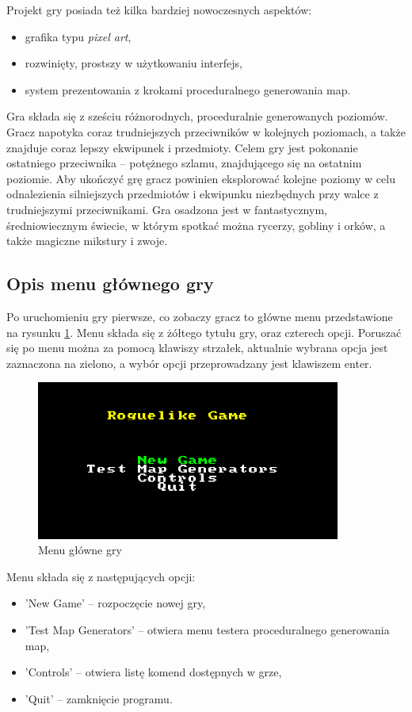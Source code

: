 \documentclass[12pt,twoside]{article}
\begin{document}
Projekt gry posiada też kilka bardziej nowoczesnych aspektów:
\begin{itemize}
	\item grafika typu \emph{pixel art},
	\item rozwinięty, prostszy w użytkowaniu interfejs,			
	\item system prezentowania z krokami proceduralnego generowania map.
\end{itemize}

Gra składa się z sześciu różnorodnych, proceduralnie generowanych poziomów. Gracz napotyka coraz trudniejszych przeciwników w kolejnych poziomach, a także znajduje coraz lepszy ekwipunek i przedmioty. Celem gry jest pokonanie ostatniego przeciwnika -- potężnego szlamu, znajdującego się na ostatnim poziomie. Aby ukończyć grę gracz powinien eksplorować kolejne poziomy w celu odnalezienia silniejszych przedmiotów i ekwipunku  niezbędnych przy walce z trudniejszymi przeciwnikami.  Gra osadzona jest w fantastycznym, średniowiecznym świecie, w którym spotkać można rycerzy, gobliny i orków, a także magiczne mikstury i zwoje.


\subsection{Opis menu głównego gry}
Po uruchomieniu gry pierwsze, co zobaczy gracz to główne menu przedstawione na rysunku \ref{mygame:scr1}. Menu składa się z żółtego tytułu gry, oraz czterech opcji. Poruszać się po menu można za pomocą klawiszy strzałek, aktualnie wybrana opcja jest zaznaczona na zielono, a wybór opcji przeprowadzany jest klawiszem enter.

\FloatBarrier
\begin{figure}[ht]
	\centering
	\includegraphics[width=10cm]{images/mygame/scr1.png}
	\caption{Menu główne gry}
	\label{mygame:scr1}
\end{figure}
\FloatBarrier

Menu składa się z następujących opcji:
\begin{itemize}
	\item 'New Game' -- rozpoczęcie nowej gry,
	\item 'Test Map Generators' -- otwiera menu testera proceduralnego generowania map,			
	\item 'Controls' -- otwiera listę komend dostępnych w grze,
	\item 'Quit' -- zamknięcie programu.
\end{itemize}
\end{document}
